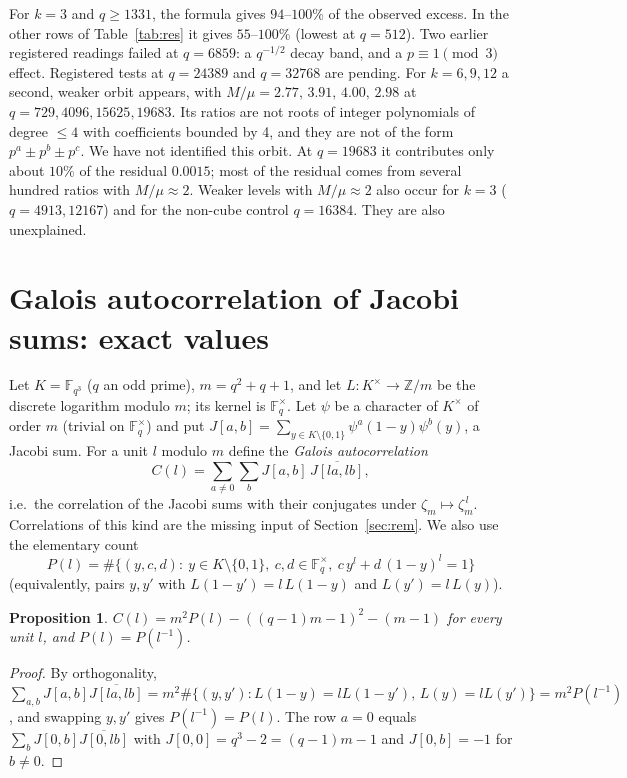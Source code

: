 \documentclass[11pt]{article}
\newtheorem{proposition}{Proposition}
\begin{document}
For $k=3$ and $q\ge1331$, the formula gives $94$--$100\%$ of the observed excess. In the other rows of Table~\ref{tab:res} it gives $55$--$100\%$ (lowest at $q=512$).
Two earlier registered readings failed at $q=6859$: a $q^{-1/2}$ decay band, and a $p\equiv1\pmod3$ effect. Registered tests at $q=24389$ and $q=32768$ are pending.
For $k=6,9,12$ a second, weaker orbit appears, with $M/\mu=2.77,\,3.91,\,4.00,\,2.98$ at $q=729,4096,15625,19683$. Its ratios are not roots of integer
polynomials of degree $\le4$ with coefficients bounded by 4, and they are not of the form $p^a\pm p^b\pm p^c$. We have not identified this orbit.
At $q=19683$ it contributes only about $10\%$ of the residual $0.0015$; most of the residual comes from several hundred ratios with $M/\mu\approx2$.
Weaker levels with $M/\mu\approx2$ also occur for $k=3$ ($q=4913,12167$) and for the non-cube control $q=16384$. They are also unexplained.

\section{Galois autocorrelation of Jacobi sums: exact values}\label{sec:gal}
Let $K=\mathbb F_{q^3}$ ($q$ an odd prime), $m=q^2+q+1$, and let $L:K^\times\to\mathbb Z/m$ be the discrete logarithm modulo $m$; its kernel is
$\mathbb F_q^\times$. Let $\psi$ be a character of $K^\times$ of order $m$ (trivial on $\mathbb F_q^\times$) and put
$J[a,b]=\sum_{y\in K\setminus\{0,1\}}\psi^a(1-y)\psi^b(y)$, a Jacobi sum. For a unit $l$ modulo $m$ define the \emph{Galois autocorrelation}
\[C(l)=\sum_{a\ne0}\sum_{b}J[a,b]\,\overline{J[la,lb]},\]
i.e.\ the correlation of the Jacobi sums with their conjugates under $\zeta_m\mapsto\zeta_m^{\,l}$. Correlations of this kind are the
missing input of Section~\ref{sec:rem}. We also use the elementary count
\[P(l)=\#\{(y,c,d):\ y\in K\setminus\{0,1\},\ c,d\in\mathbb F_q^\times,\ c\,y^l+d\,(1-y)^l=1\}\]
(equivalently, pairs $y,y'$ with $L(1-y')=l\,L(1-y)$ and $L(y')=l\,L(y)$).

\begin{proposition}\label{prop:gal}
$C(l)=m^2P(l)-((q-1)m-1)^2-(m-1)$ for every unit $l$, and $P(l)=P(l^{-1})$.
\end{proposition}
\begin{proof}
By orthogonality, $\sum_{a,b}J[a,b]\overline{J[la,lb]}=m^2\#\{(y,y'):L(1-y)=lL(1-y'),\,L(y)=lL(y')\}=m^2P(l^{-1})$, and swapping $y,y'$ gives
$P(l^{-1})=P(l)$. The row $a=0$ equals $\sum_b J[0,b]\overline{J[0,lb]}$ with $J[0,0]=q^3-2=(q-1)m-1$ and $J[0,b]=-1$ for $b\ne0$.
\end{proof}
\end{document}
